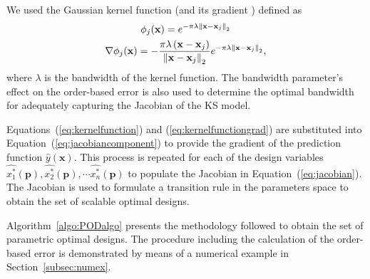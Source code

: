 We used the Gaussian kernel function (and its gradient ) defined as
\begin{gather}
	\label{eq:kernelfunction}
	\phi_j(\mathbf{x}) = e^{-\pi\lambda \left\lVert\mathbf{x}-\mathbf{x}_j\right\rVert_2}\\
	\label{eq:kernelfunctiongrad}
	\nabla\phi_j(\mathbf{x}) = -\dfrac{\pi\lambda\left(\mathbf{x} - \mathbf{x}_j\right)}{\left\lVert\mathbf{x} - \mathbf{x}_j\right\rVert_2}e^{-\pi\lambda \left\lVert\mathbf{x}-\mathbf{x}_j\right\rVert_2},
\end{gather}
where $\lambda$ is the bandwidth of the kernel function. The bandwidth parameter's effect on the order-based error is also used to determine the optimal bandwidth for adequately capturing the Jacobian of the \ac{KS} model.

Equations~(\ref{eq:kernelfunction}) and (\ref{eq:kernelfunctiongrad}) are substituted into Equation~(\ref{eq:jacobiancomponent}) to provide the gradient of the prediction function $\hat{y}(\mathbf{x})$. This process is repeated for each of the design variables $\hat{x_1^*}(\mathbf{p}), \hat{x_2^*}(\mathbf{p}), \cdots \hat{x_n^*}(\mathbf{p})$ to populate the Jacobian in Equation~(\ref{eq:jacobian}). The Jacobian is used to formulate a transition rule in the parameters space to obtain the set of scalable optimal designs.

Algorithm~\ref{algo:PODalgo} presents the methodology followed to obtain the set of parametric optimal designs. The procedure including the calculation of the order-based error is demonstrated by means of a numerical example in Section~\ref{subsec:numex}.

